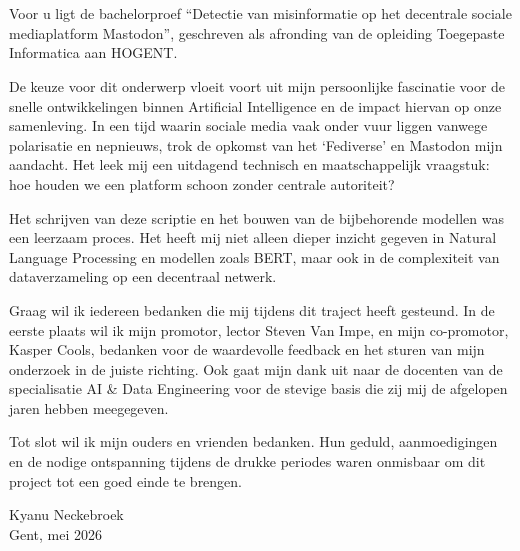 \documentclass[a4paper,11pt]{report}
\begin{document}

\chapter*{}%
\label{ch:voorwoord}

Voor u ligt de bachelorproef ``Detectie van misinformatie op het decentrale sociale mediaplatform Mastodon'', geschreven als afronding van de opleiding Toegepaste Informatica aan HOGENT.

De keuze voor dit onderwerp vloeit voort uit mijn persoonlijke fascinatie voor de snelle ontwikkelingen binnen Artificial Intelligence en de impact hiervan op onze samenleving. In een tijd waarin sociale media vaak onder vuur liggen vanwege polarisatie en nepnieuws, trok de opkomst van het `Fediverse' en Mastodon mijn aandacht. Het leek mij een uitdagend technisch en maatschappelijk vraagstuk: hoe houden we een platform schoon zonder centrale autoriteit?

Het schrijven van deze scriptie en het bouwen van de bijbehorende modellen was een leerzaam proces. Het heeft mij niet alleen dieper inzicht gegeven in Natural Language Processing en modellen zoals BERT, maar ook in de complexiteit van dataverzameling op een decentraal netwerk.

Graag wil ik iedereen bedanken die mij tijdens dit traject heeft gesteund. In de eerste plaats wil ik mijn promotor, lector Steven Van Impe, en mijn co-promotor, Kasper Cools, bedanken voor de waardevolle feedback en het sturen van mijn onderzoek in de juiste richting. Ook gaat mijn dank uit naar de docenten van de specialisatie AI \& Data Engineering voor de stevige basis die zij mij de afgelopen jaren hebben meegegeven.

Tot slot wil ik mijn ouders en vrienden bedanken. Hun geduld, aanmoedigingen en de nodige ontspanning tijdens de drukke periodes waren onmisbaar om dit project tot een goed einde te brengen.

\vspace{1cm}

Kyanu Neckebroek \\
Gent, mei 2026
\end{document}
